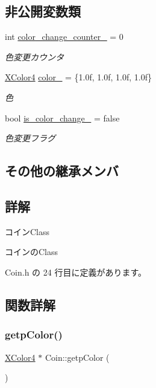 \subsection*{非公開変数類}
\begin{DoxyCompactItemize}
\item 
int \mbox{\hyperlink{class_coin_a878d12620757966eb5f428d5daca1300}{color\+\_\+change\+\_\+counter\+\_\+}} = 0
\begin{DoxyCompactList}\small\item\em 色変更カウンタ \end{DoxyCompactList}\item 
\mbox{\hyperlink{_vector3_d_8h_a680c30c4a07d86fe763c7e01169cd6cc}{X\+Color4}} \mbox{\hyperlink{class_coin_ad7ac386426c33a4f74018ebea69bb479}{color\+\_\+}} = \{1.\+0f, 1.\+0f, 1.\+0f, 1.\+0f\}
\begin{DoxyCompactList}\small\item\em 色 \end{DoxyCompactList}\item 
bool \mbox{\hyperlink{class_coin_a291ad958579e6b0c94c928acef25d035}{is\+\_\+color\+\_\+change\+\_\+}} = false
\begin{DoxyCompactList}\small\item\em 色変更フラグ \end{DoxyCompactList}\end{DoxyCompactItemize}
\subsection*{その他の継承メンバ}


\subsection{詳解}
コイン\+Class 

コインの\+Class 

 Coin.\+h の 24 行目に定義があります。



\subsection{関数詳解}
\mbox{\label{class_coin_aade96d8bc4eb1ced29e998f49add22ef}} 
\subsubsection{\texorpdfstring{getp\+Color()}{getpColor()}}
{\footnotesize\ttfamily \mbox{\hyperlink{_vector3_d_8h_a680c30c4a07d86fe763c7e01169cd6cc}{X\+Color4}} $\ast$ Coin\+::getp\+Color (\begin{DoxyParamCaption}{ }\end{DoxyParamCaption})}



